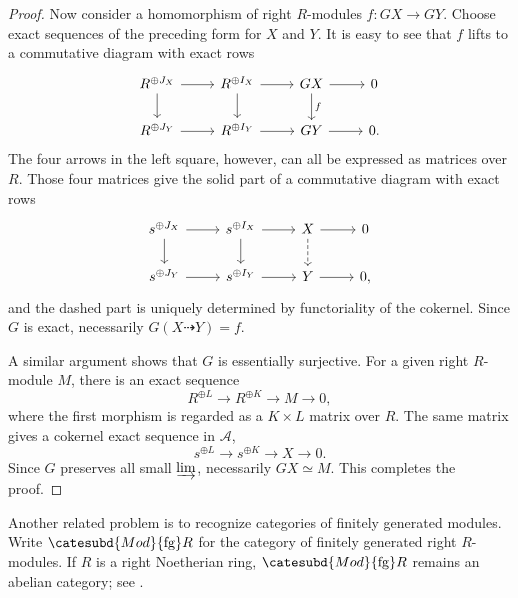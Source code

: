\begin{proof}
	Now consider a homomorphism of right $R$-modules $f:GX\to GY$. Choose
	exact sequences of the preceding form for $X$ and $Y$. It is easy to see
	that $f$ lifts to a commutative diagram with exact rows
	\[\begin{tikzcd}
		R^{\oplus J_X} \arrow[r] \arrow[d] & R^{\oplus I_X} \arrow[d] \arrow[r] & GX \arrow[d, "f"] \arrow[r] & 0 \\
		R^{\oplus J_Y} \arrow[r] & R^{\oplus I_Y} \arrow[r] & GY \arrow[r] & 0.
	\end{tikzcd}\]
	The four arrows in the left square, however, can all be expressed as
	matrices over $R$. Those four matrices give the solid part of a
	commutative diagram with exact rows
	\[\begin{tikzcd}
		s^{\oplus J_X} \arrow[r] \arrow[d] & s^{\oplus I_X} \arrow[d] \arrow[r] & X \arrow[dashed, d] \arrow[r] & 0 \\
		s^{\oplus J_Y} \arrow[r] & s^{\oplus I_Y} \arrow[r] & Y \arrow[r] & 0,
	\end{tikzcd}\]
	and the dashed part is uniquely determined by functoriality of the
	cokernel. Since $G$ is exact, necessarily $G(X\dashrightarrow Y)=f$.

	A similar argument shows that $G$ is essentially surjective. For a given
	right $R$-module $M$, there is an exact sequence
	\[ R^{\oplus L} \to R^{\oplus K} \to M \to 0, \]
	where the first morphism is regarded as a $K\times L$ matrix over $R$.
	The same matrix gives a cokernel exact sequence in $\mathcal{A}$,
	\[ s^{\oplus L} \to s^{\oplus K} \to X \to 0. \]
	Since $G$ preserves all small $\varinjlim$, necessarily $GX\simeq M$.
	This completes the proof.
\end{proof}

Another related problem is to recognize categories of finitely generated
modules. Write $\catesubd{Mod}{\mathrm{fg}}R$ for the category of finitely
generated right $R$-modules. If $R$ is a right Noetherian ring,
$\catesubd{Mod}{\mathrm{fg}}R$ remains an abelian category; see
\cite[Proposition 6.10.3, Lemma 6.10.4]{Li1}.

